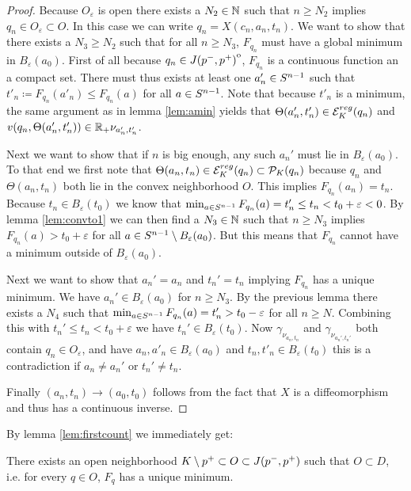 \begin{proof}
    Because $O_\varepsilon$ is open there exists a $N_2\in \mathbb{N}$ such that $n\ge N_2$ implies $q_n\in O_\varepsilon\subset O$.
    In this case we can write $q_n = X(c_n,a_n,t_n)$. We want to show that there exists a $N_3\ge N_2$ such that for all $n\ge N_3$, $F_{q_n}$ must have a global minimum in $B_\varepsilon(a_0)$. First of all because $q_n \in {\kern0ptJ(p^-,p^+)}^{\mathrm{o}}$, $F_{q_n}$ is a continuous function an a compact set. There must thus exists at least one $a'_n\in {S^{n-1}}$ such that $t'_n \coloneqq  F_{q_n}(a'_n) \leq F_{q_n}(a)$ for all $a\in {S^{n-1}}$. Note that because $t'_n$ is a minimum, the same argument as in lemma \ref{lem:amin} yields that $\Theta(a'_n,t_n')\in {{\mathcal{E}}^{reg}_K}(q_n)$ and $v(q_n,\Theta(a'_n,t_n')) \in \mathbb{R}_+\nu_{a_n',t_n'}$.
    
    Next we want to show that if $n$ is big enough, any such $a_n'$ must lie in $B_\varepsilon(a_0)$. 
    To that end we first note that  $\Theta(a_n,t_n)\in {{\mathcal{E}}^{reg}_K}(q_n)\subset {\mathcal{P}}_K(q_n)$ because $q_n$ and $\Theta(a_n,t_n)$ both lie in the convex neighborhood $O$. 
    This implies $F_{q_n}(a_n)=t_n$. 
    Because $t_n\in B_\varepsilon(t_0)$ we know that $\min_{a\in {S^{n-1}}}F_{q_n}(a) = t'_n\leq t_n < t_0+\varepsilon < 0$. 
    By lemma \ref{lem:convto1} we can then find a $N_3\in \mathbb{N}$ such that $n\ge N_3$ implies $F_{q_n}(a)>t_0+\varepsilon$ for all $a\in {S^{n-1}} \setminus B_\varepsilon(a_0)$. But this means that $F_{q_n}$ cannot have a minimum outside of $B_\varepsilon(a_0)$.

    Next we want to show that $a_n'=a_n$ and $t_n'=t_n$ implying $F_{q_n}$ has a unique minimum.
    We have $a_n'\in B_\varepsilon(a_0)$ for $n\ge N_3$. By the previous lemma there exists a $N_4$ such that $\min_{a\in {S^{n-1}}} F_{q_n}(a)=t'_n> t_0-\varepsilon$ for all $n\ge N$. Combining this with $t_n'\leq t_n < t_0+\varepsilon$ we have $t_n'\in B_\varepsilon(t_0)$. Now $\gamma_{\nu_{a_n,t_n}}$ and $\gamma_{\nu_{a_n',t_n'}}$ both contain $q_n\in O_\varepsilon$, and have $a_n,a'_n\in B_\varepsilon(a_0)$ and $t_n,t'_n\in B_\varepsilon(t_0)$ this is a contradiction if $a_n\neq a_n'$ or $t_n'\neq t_n$. 

    Finally $(a_n,t_n)\to (a_0,t_0)$ follows from the fact that $X$ is a diffeomorphism and thus has a continuous inverse.
\end{proof}

By lemma \ref{lem:firstcount} we immediately get:
\begin{corollary}
    There exists an open neighborhood $K\setminus p^+\subset O\subset J(p^-,p^+)$ such that $O\subset D$, i.e. for every $q\in O$, $F_q$ has a unique minimum.
\end{corollary}

